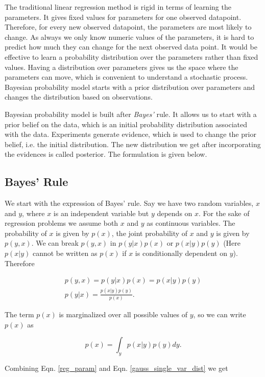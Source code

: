 \documentclass[english]{tktltiki}
\begin{document}
The traditional linear regression method is rigid in terms of learning the parameters. It gives fixed values for parameters for one observed datapoint. Therefore, for every new observed datapoint, the parameters are most likely to change. As always we only know numeric values of the parameters, it is hard to predict how much they can change for the next observed data point.  It would be effective to learn a probability distribution over the parameters rather than fixed values. Having a distribution over parameters gives us the space where the parameters can move, which is convenient to understand a stochastic process. Bayesian probability model starts with a prior distribution over parameters and changes the distribution based on observations.

Bayesian probability model is built after \textit{Bayes'} rule. It allows us to start with a prior belief on the data, which is an initial probability distribution associated with the data. Experiments generate evidence, which is used to change the prior belief, i.e. the initial distribution. The new distribution we get after incorporating the evidences is called posterior. The formulation is given below.

\subsection{Bayes' Rule}

We start with the expression of Bayes' rule. Say we have two random variables, $x$ and $y$, where $x$ is an independent variable but $y$ depends on $x$. For the sake of regression problems we assume both $x$ and $y$ as continuous variables. The probability of $x$ is given by $p(x)$, the joint probability of $x$ and $y$ is given by $p(y, x)$. We can break $p(y, x)$ in $p(y|x)p(x)$ or $p(x|y)p(y)$ (Here $p(x|y)$ cannot be written as $p(x)$ if $x$ is conditionally dependent on $y$). Therefore

\begin{eqnarray}
p(y, x) = p(y|x)p(x) = p(x|y)p(y)\nonumber\\
p(y|x) = \frac{p(x|y)p(y)}{p(x)}.
\end{eqnarray}


The term $p(x)$ is marginalized over all possible values of $y$, so we can write $p(x)$ as

\begin{equation}
p(x) = \int_y{p(x|y)p(y)dy}.
\end{equation}


Combining Eqn. \ref{reg_param} and Eqn. \ref{gauss_single_var_dist} we get
\end{document}
